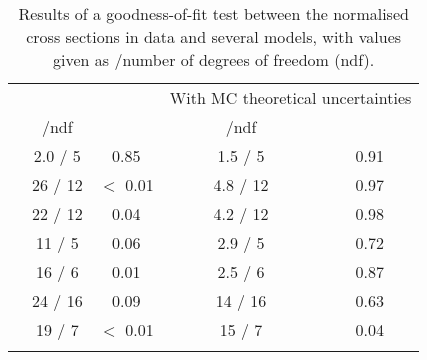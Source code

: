 \clearpage
\begin{table}
	\caption{Results of a goodness-of-fit test between the normalised cross sections in data and several models, with values given as \chis/number of degrees of freedom (ndf).}
	\centering
	\label{tb:Chi2_normalised}
	\begin{tabular}{ccccc}
		&	 \multicolumn{2}{c}{\powhegpythia} & 	 \multicolumn{2}{c}{With MC theoretical uncertainties} \\ 
		\vspace*{0.02cm} &	\chis/ndf & \pvalue &	\chis/ndf & \pvalue \\	\hline
		\vspace*{0.02cm} \NJET &	2.0 / 5 &	 0.85 &	1.5 / 5 &	 0.91 \\
		\vspace*{0.02cm} \HT &	26 / 12 &	 $<$ 0.01 &	4.8 / 12 &	 0.97 \\
		\vspace*{0.02cm} \ST &	22 / 12 &	 0.04 &	4.2 / 12 &	 0.98 \\
		\vspace*{0.02cm} \ptmiss &	11 / 5 &	 0.06 &	2.9 / 5 &	 0.72 \\
		\vspace*{0.02cm} \WPT &	16 / 6 &	 0.01 &	2.5 / 6 &	 0.87 \\
		\vspace*{0.02cm} \LPT &	24 / 16 &	 0.09 &	14 / 16 &	 0.63 \\
		\vspace*{0.02cm} \LETA &	19 / 7 &	 $<$ 0.01 &	15 / 7 &	 0.04 \\
		\vspace*{0.2cm} 
		\newline 
	\end{tabular}
\end{table}
